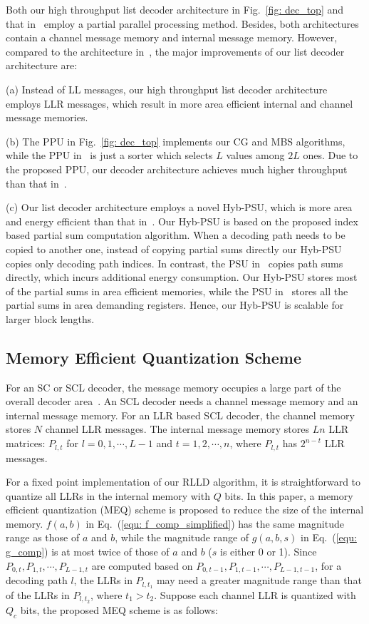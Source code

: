 \documentclass[journal]{IEEEtran}
\begin{document}
Both our high throughput list decoder architecture in Fig.~\ref{fig: dec_top} and that in~\cite{jun_low_mem_list} employ a partial parallel processing method. Besides, both architectures contain a channel message memory and internal message memory. However, compared to the architecture in~\cite{jun_low_mem_list}, the major improvements of our list decoder architecture are:

(a) Instead of LL messages, our high throughput list decoder architecture employs LLR messages, which result in more area efficient internal and channel message memories.

(b) The PPU in Fig.~\ref{fig: dec_top} implements our CG and MBS algorithms, while the PPU in~\cite{jun_low_mem_list} is just a sorter which selects $L$ values among $2L$ ones. Due to the proposed PPU, our decoder architecture achieves much higher throughput than that in~\cite{jun_low_mem_list}.

(c) Our list decoder architecture employs a novel Hyb-PSU, which is more area and energy efficient than that in~\cite{jun_low_mem_list}. Our Hyb-PSU is based on the proposed index based partial sum computation algorithm. When a decoding path needs to be copied to another one, instead of copying partial sums directly our Hyb-PSU copies only decoding path indices. In contrast, the PSU in~\cite{jun_low_mem_list} copies path sums directly, which incurs additional energy consumption. Our Hyb-PSU stores most of the partial sums in area efficient memories, while the PSU in~\cite{jun_low_mem_list} stores all the partial sums in area demanding registers. Hence, our Hyb-PSU is scalable for larger block lengths.






\subsection{Memory Efficient Quantization Scheme}
\label{sec: quan}
For an SC or SCL decoder, the message memory occupies a large part of the overall decoder area~\cite{gross_polar1, jun_low_mem_list}. An SCL decoder needs a channel message memory and an internal message memory. For an LLR based SCL decoder, the channel memory stores $N$ channel LLR messages. The internal message memory stores $Ln$ LLR matrices: $P_{l,t}$ for $l=0,1,\cdots,L-1$ and $t=1,2,\cdots,n$, where $P_{l,t}$ has $2^{n-t}$ LLR messages.

For a fixed point implementation of our RLLD algorithm, it is straightforward to quantize all LLRs in the internal memory with $Q$ bits.
In this paper, a memory efficient quantization (MEQ) scheme is proposed to reduce the size of the internal memory. $f(a,b)$ in Eq.~(\ref{equ: f_comp_simplified}) has the same magnitude range as those of $a$ and $b$, while the magnitude range of $g(a,b,s)$ in Eq.~(\ref{equ: g_comp}) is at most twice of those of $a$ and $b$ ($s$ is either 0 or 1). Since $P_{0,t},P_{1,t},\cdots,P_{L-1,t}$ are computed based on $P_{0,t-1},P_{1,t-1},\cdots,P_{L-1,t-1}$, for a decoding path $l$, the LLRs in $P_{l,t_1}$ may need a greater magnitude range than that of the LLRs in $P_{l,t_2}$, where $t_1 > t_2$. Suppose each channel LLR is quantized with $Q_c$ bits, the proposed MEQ scheme is as follows:
\end{document}
